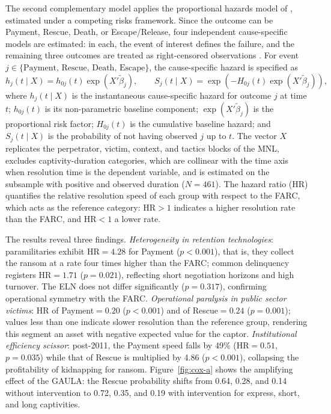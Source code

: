\documentclass[ecta,nameyear,draft]{econsocart}
\theoremstyle{plain}
\theoremstyle{definition}
\newcommand{\1}{\mathbf{1}}
\begin{document}
The second complementary model applies the proportional hazards model of \citet{Cox1972}, estimated under a competing risks framework. Since the outcome can be Payment, Rescue, Death, or Escape/Release, four independent cause-specific models are estimated: in each, the event of interest defines the failure, and the remaining three outcomes are treated as right-censored observations \citet{Bradburn2003}. For event $j\in\{\text{Payment, Rescue, Death, Escape}\}$, the cause-specific hazard is specified as
\begin{equation}
h_j(t \mid X) = h_{0j}(t)\exp\!\left(X'\tilde{\beta}_j\right),
\qquad
S_j(t \mid X) = \exp\!\left(-H_{0j}(t)\exp\!\left(X'\tilde{\beta}_j\right)\right),
\label{eq:cox}
\end{equation}
where $h_j(t\mid X)$ is the instantaneous cause-specific hazard for outcome $j$ at time $t$; $h_{0j}(t)$ is its non-parametric baseline component; $\exp(X'\tilde{\beta}_j)$ is the proportional risk factor; $H_{0j}(t)$ is the cumulative baseline hazard; and $S_j(t\mid X)$ is the probability of not having observed $j$ up to $t$. The vector $X$ replicates the perpetrator, victim, context, and tactics blocks of the MNL, excludes captivity-duration categories, which are collinear with the time axis when resolution time is the dependent variable, and is estimated on the subsample with positive and observed duration ($N=461$). The hazard ratio (HR) quantifies the relative resolution speed of each group with respect to the FARC, which acts as the reference category: HR$>1$ indicates a higher resolution rate than the FARC, and HR$<1$ a lower rate.

The results reveal three findings. \textit{Heterogeneity in retention technologies}: paramilitaries exhibit HR$=4.28$ for Payment ($p<0.001$), that is, they collect the ransom at a rate four times higher than the FARC; common delinquency registers HR$=1.71$ ($p=0.021$), reflecting short negotiation horizons and high turnover. The ELN does not differ significantly ($p=0.317$), confirming operational symmetry with the FARC. \textit{Operational paralysis in public sector victims}: HR of Payment$=0.20$ ($p<0.001$) and of Rescue$=0.24$ ($p=0.001$); values less than one indicate slower resolution than the reference group, rendering this segment an asset with negative expected value for the captor. \textit{Institutional efficiency scissor}: post-2011, the Payment speed falls by 49\% (HR$=0.51$, $p=0.035$) while that of Rescue is multiplied by 4.86 ($p<0.001$), collapsing the profitability of kidnapping for ransom. Figure~\ref{fig:cox-a} shows the amplifying effect of the GAULA: the Rescue probability shifts from 0.64, 0.28, and 0.14 without intervention to 0.72, 0.35, and 0.19 with intervention for express, short, and long captivities.
\end{document}
